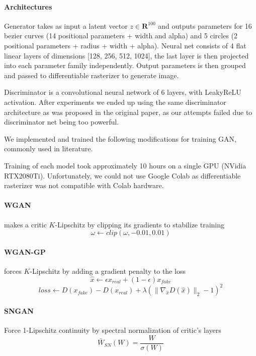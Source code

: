 \documentclass{article}
\begin{document}
	\paragraph{Architectures}
	Generator takes as input a latent vector $z \in \mathbf{R}^100$ and outputs parameters for 16 bezier curves (14 positional parameters + width and alpha) and 5 circles (2 positional parameters + radius + width + alpha).   Neural net consists of 4 flat linear layers of dimensions [128, 256, 512, 1024], the last layer is then projected into each parameter family independently. Output parameters is then grouped and passed to differentiable rasterizer to generate image.
	
	Discriminator is a convolutional neural network of 6 layers, with LeakyReLU activation. After experiments we ended up using the same discriminator architecture as was proposed in the original paper, as our attempts failed due to discriminator net being too powerful.
	
	We implemented and trained the following modifications for training GAN, commonly used in literature.
	
	Training of each model took approximately 10 hours on a single GPU (NVidia RTX2080Ti). Unfortunately, we could not use Google Colab as differentiable rasterizer was not compatible with Colab hardware. 
	
	\paragraph{WGAN} \cite{arjovsky2017wasserstein} makes a critic $K$-Lipschitz by clipping its gradients to stabilize training 
	$$\omega \leftarrow clip (\omega, -0.01, 0.01)$$
	
	\paragraph {WGAN-GP} \cite{gulrajani2017improved} forces $K$-Lipschitz by adding a gradient penalty to the loss
	$$\hat x \leftarrow \epsilon x_{real} + (1-\epsilon) x_{fake}$$ 
	$$loss \leftarrow D(x_{fake}) - D(x_{real}) + \lambda (\| \nabla_{\hat x} D(\hat x) \|_2 - 1)^2$$
	
	\paragraph {SNGAN} \cite{miyato2018spectral} Force 1-Lipschitz continuity by spectral normalization of critic's layers
	$$\bar W_{SN} (W) = \frac W {\sigma(W)} $$
	
\end{document}
